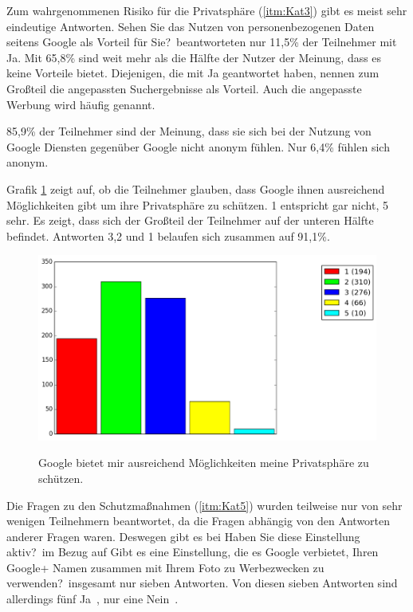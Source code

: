 Zum wahrgenommenen Risiko für die Privatsphäre (\ref{itm:Kat3}) gibt es meist sehr eindeutige Antworten. \glqq Sehen Sie das Nutzen von personenbezogenen Daten seitens Google als Vorteil für Sie?\grqq\ beantworteten nur 11,5\% der Teilnehmer mit Ja. Mit 65,8\% sind weit mehr als die Hälfte der Nutzer der Meinung, dass es keine Vorteile bietet.
Diejenigen, die mit Ja geantwortet haben, nennen zum Großteil die angepassten Suchergebnisse als Vorteil. Auch die angepasste Werbung wird häufig genannt.

85,9\% der Teilnehmer sind der Meinung, dass sie sich bei der Nutzung von Google Diensten gegenüber Google nicht anonym fühlen. Nur 6,4\% fühlen sich anonym.

Grafik \ref{possibilities} zeigt auf, ob die Teilnehmer glauben, dass Google ihnen ausreichend Möglichkeiten gibt um ihre Privatsphäre zu schützen. 1 entspricht gar nicht, 5 sehr. Es zeigt, dass sich der Großteil der Teilnehmer auf der unteren Hälfte befindet. Antworten 3,2 und 1 belaufen sich zusammen auf 91,1\%. 

\begin{figure}[H]
\centering
\includegraphics[scale=0.55]{images/possibilities}\\
\caption{Google bietet mir ausreichend Möglichkeiten meine Privatsphäre zu schützen.}\label{possibilities}
\end{figure}

Die Fragen zu den Schutzmaßnahmen (\ref{itm:Kat5}) wurden teilweise nur von sehr wenigen Teilnehmern beantwortet, da die Fragen abhängig von den Antworten anderer Fragen waren. Deswegen gibt es bei \glqq Haben Sie diese Einstellung aktiv?\grqq\ im Bezug auf \glqq Gibt es eine Einstellung, die es Google verbietet, Ihren Google+ Namen zusammen mit Ihrem Foto zu Werbezwecken zu verwenden?\grqq\ insgesamt nur sieben Antworten. Von diesen sieben Antworten sind allerdings fünf \glqq Ja\grqq\ , nur eine \glqq Nein\grqq\ .

